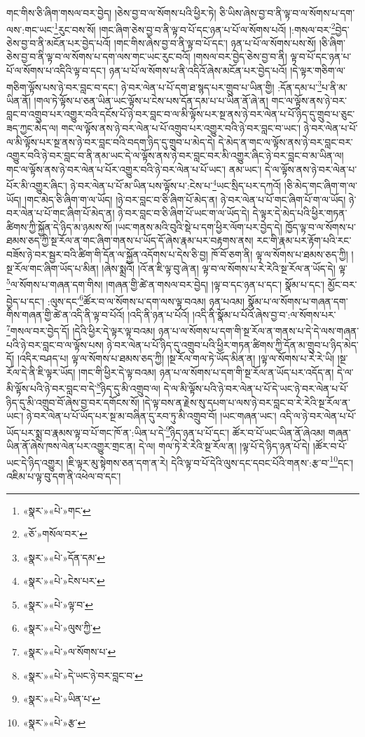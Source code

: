 གང་གིས་ཅི་ཞིག་གསལ་བར་བྱེད། །ཅེས་བྱ་བ་ལ་སོགས་པའི་ཕྱིར་ཏེ། ཅི་ཡིས་ཞེས་བྱ་བ་ནི་ལྟ་བ་ལ་སོགས་པ་དག་ལས་:གང་ཡང་\footnote{«སྣར་»«པེ་»གང་}རུང་བས་སོ། །གང་ཞིག་ཅེས་བྱ་བ་ནི་ལྟ་བ་པོ་དང་ཉན་པ་པོ་ལ་སོགས་པའོ། །:གསལ་བར་\footnote{«ཅོ་»གསོལ་བར་}བྱེད་ཅེས་བྱ་བ་ནི་མངོན་པར་བྱེད་པའོ། །གང་གིས་ཞེས་བྱ་བ་ནི་ལྟ་བ་པོ་དང་། ཉན་པ་པོ་ལ་སོགས་པས་སོ། །ཅི་ཞིག་ཅེས་བྱ་བ་ནི་ལྟ་བ་ལ་སོགས་པ་དག་ལས་གང་ཡང་རུང་བའོ། །གསལ་བར་བྱེད་ཅེས་བྱ་བ་ནི། ལྟ་བ་པོ་དང་ཉན་པ་པོ་ལ་སོགས་པ་འདིའི་ལྟ་བ་དང་། ཉན་པ་པོ་ལ་སོགས་པ་ནི་འདིའོ་ཞེས་མངོན་པར་བྱེད་པའོ། །དེ་ལྟར་གཅིག་ལ་གཅིག་ལྟོས་པས་ཉེ་བར་བླང་བ་དང་། ཉེ་བར་ལེན་པ་པོ་དག་ཐ་སྙད་པར་གྲུབ་པ་ཡིན་གྱི། :དོན་དམ་པ་\footnote{«སྣར་»«པེ་»དོན་དམ་}པ་ནི་མ་ཡིན་ནོ། །གལ་ཏེ་ལྟོས་པ་ཅན་ཡིན་ཡང་ལྟོས་པ་ངེས་པས་དོན་དམ་པ་པ་ཡིན་ནོ་ཞེ་ན། གང་ལ་ལྟོས་ནས་ཉེ་བར་བླང་བ་འགྲུབ་པར་འགྱུར་བའི་དངོས་པོ་ཉེ་བར་བླང་བ་ལ་མི་ལྟོས་པར་སྔ་ནས་ཉེ་བར་ལེན་པ་པོ་ཉིད་དུ་གྲུབ་པ་ཅུང་ཟད་ཀྱང་མེད་ལ། གང་ལ་ལྟོས་ནས་ཉེ་བར་ལེན་པ་པོ་འགྲུབ་པར་འགྱུར་བའི་ཉེ་བར་བླང་བ་ཡང་། ཉེ་བར་ལེན་པ་པོ་ལ་མི་ལྟོས་པར་སྔ་ནས་ཉེ་བར་བླང་བའི་བདག་ཉིད་དུ་གྲུབ་པ་མེད་དེ། དེ་མེད་ན་གང་ལ་ལྟོས་ནས་ཉེ་བར་བླང་བར་འགྱུར་བའི་ཉེ་བར་བླང་བ་ནི་ནམ་ཡང་དེ་ལ་ལྟོས་ནས་ཉེ་བར་བླང་བར་མི་འགྱུར་ཞིང་ཉེ་བར་བླང་བ་མ་ཡིན་ལ། གང་ལ་ལྟོས་ནས་ཉེ་བར་ལེན་པ་པོར་འགྱུར་བའི་ཉེ་བར་ལེན་པ་པོ་ཡང་། ནམ་ཡང་། དེ་ལ་ལྟོས་ནས་ཉེ་བར་ལེན་པ་པོར་མི་འགྱུར་ཞིང་། ཉེ་བར་ལེན་པ་པོ་མ་ཡིན་པས་ལྟོས་པ་:ངེས་པ་\footnote{«སྣར་»«པེ་»ངེས་པར་}ཡང་སྲིད་པར་དཀའོ། །ཅི་མེད་གང་ཞིག་ག་ལ་ཡོད། །གང་མེད་ཅི་ཞིག་ག་ལ་ཡོད། །ཉེ་བར་བླང་བ་ཅི་ཞིག་པོ་མེད་ན། ཉེ་བར་ལེན་པ་པོ་གང་ཞིག་པོ་ག་ལ་ཡོད། ཉེ་བར་ལེན་པ་པོ་གང་ཞིག་པོ་མེད་ན། ཉེ་བར་བླང་བ་ཅི་ཞིག་པོ་ཡང་ག་ལ་ཡོད་དེ། དེ་ལྟར་དེ་མེད་པའི་ཕྱིར་གཏན་ཚིགས་ཀྱི་སྐྱོན་དེ་ཉིད་མ་ཉམས་སོ། །ཡང་གནས་མའི་བུའི་སྡེ་པ་དག་ཕྱིར་ལོག་པར་བྱེད་དེ། ཁྱོད་ལྟ་བ་ལ་སོགས་པ་ཐམས་ཅད་ཀྱི་སྔ་རོལ་ན་གང་ཞིག་གནས་པ་ཡོད་དོ་ཞེས་རྣམ་པར་བརྟགས་ནས། རང་གི་རྣམ་པར་རྟོག་པའི་རང་བཟོས་ཉེ་བར་སྦྱར་བའི་ཚིག་གི་དོན་ལ་སྐྱོན་འདོགས་པ་དེས་ཅི་བྱ། ཁོ་བོ་ཅག་ནི། ལྟ་ལ་སོགས་པ་ཐམས་ཅད་ཀྱི། །སྔ་རོལ་གང་ཞིག་ཡོད་པ་མིན། །ཞེས་སྨྲའོ། །འོ་ན་ཇི་ལྟ་བུ་ཞེ་ན། ལྟ་བ་ལ་སོགས་པ་རེ་རེའི་སྔ་རོལ་ན་ཡོད་དེ། ལྟ་\footnote{«སྣར་»«པེ་»ལྟ་བ་}ལ་སོགས་པ་གཞན་དག་གིས། །གཞན་གྱི་ཚེ་ན་གསལ་བར་བྱེད། །ལྟ་བ་དང་ཉན་པ་དང་། སྣོམ་པ་དང་། མྱོང་བར་བྱེད་པ་དང་། :ལུས་དང་\footnote{«སྣར་»«པེ་»ལུས་ཀྱི་}ཚོར་བ་ལ་སོགས་པ་དག་ལས་ལྟ་བའམ། ཉན་པའམ། སྣོམ་པ་ལ་སོགས་པ་གཞན་དག་གིས་གཞན་གྱི་ཚེ་ན་འདི་ནི་ལྟ་བ་པོའོ། །འདི་ནི་ཉན་པ་པོའོ། །འདི་ནི་སྣོམ་པ་པོའོ་ཞེས་བྱ་བ་:ལ་སོགས་པར་\footnote{«སྣར་»«པེ་»ལ་སོགས་པ་}གསལ་བར་བྱེད་དོ། །དེའི་ཕྱིར་དེ་ལྟར་ལྟ་བའམ། ཉན་པ་ལ་སོགས་པ་དག་གི་སྔ་རོལ་ན་གནས་པ་དེ་དེ་ལས་གཞན་པའི་ཉེ་བར་བླང་བ་ལ་ལྟོས་པས། ཉེ་བར་ལེན་པ་པོ་ཉིད་དུ་འགྲུབ་པའི་ཕྱིར་གཏན་ཚིགས་ཀྱི་དོན་མ་གྲུབ་པ་ཉིད་མེད་དོ། །འདིར་བཤད་པ། ལྟ་ལ་སོགས་པ་ཐམས་ཅད་ཀྱི། །སྔ་རོལ་གལ་ཏེ་ཡོད་མིན་ན། །ལྟ་ལ་སོགས་པ་རེ་རེ་ཡི། །སྔ་རོལ་དེ་ནི་ཇི་ལྟར་ཡོད། །གང་གི་ཕྱིར་དེ་ལྟ་བའམ། ཉན་པ་ལ་སོགས་པ་དག་གི་སྔ་རོལ་ན་ཡོད་པར་འདོད་ན། དེ་ལ་མི་ལྟོས་པའི་ཉེ་བར་བླང་བ་དེ་\footnote{«སྣར་»«པེ་»དེ་ཡང་ཉེ་བར་བླང་བ་}ཉིད་དུ་མི་འགྲུབ་ལ། དེ་ལ་མི་ལྟོས་པའི་ཉེ་བར་ལེན་པ་པོ་དེ་ཡང་ཉེ་བར་ལེན་པ་པོ་ཉིད་དུ་མི་འགྲུབ་བོ་ཞེས་བྱ་བར་དགོངས་སོ། །དེ་ལྟ་བས་ན་རྗེས་སུ་དཔག་པ་ལས་ཉེ་བར་བླང་བ་རེ་རེའི་སྔ་རོལ་ན་ཡང་། ཉེ་བར་ལེན་པ་པོ་ཡོད་པར་སྔ་མ་བཞིན་དུ་རབ་ཏུ་མི་འགྲུབ་བོ། །ཡང་གཞན་ཡང་། འདི་ལ་ཉེ་བར་ལེན་པ་པོ་ཡོད་པར་སྨྲ་བ་རྣམས་ལྟ་བ་པོ་གང་ཁོ་ན་:ཡིན་པ་དེ་\footnote{«སྣར་»«པེ་»ཡིན་པ་}ཉིད་ཉན་པ་པོ་དང་། ཚོར་བ་པོ་ཡང་ཡིན་ནོ་ཞེའམ། གཞན་ཡིན་ནོ་ཞེས་ཁས་ལེན་པར་འགྱུར་གྲང་ན། དེ་ལ། གལ་ཏེ་རེ་རེའི་སྔ་རོལ་ན། །ལྟ་པོ་དེ་ཉིད་ཉན་པོ་དེ། །ཚོར་བ་པོ་ཡང་དེ་ཉིད་འགྱུར། །ཇི་ལྟར་མུ་སྟེགས་ཅན་དག་ན་རེ། དེའི་ལྟ་བ་པོ་དེའི་ལུས་དང་དབང་པོའི་གནས་:རྩ་བ་\footnote{«སྣར་»«པེ་»རྩ་}དང་། འཇིམ་པ་ལྟ་བུ་དག་ནི་འཕེལ་བ་དང་། 